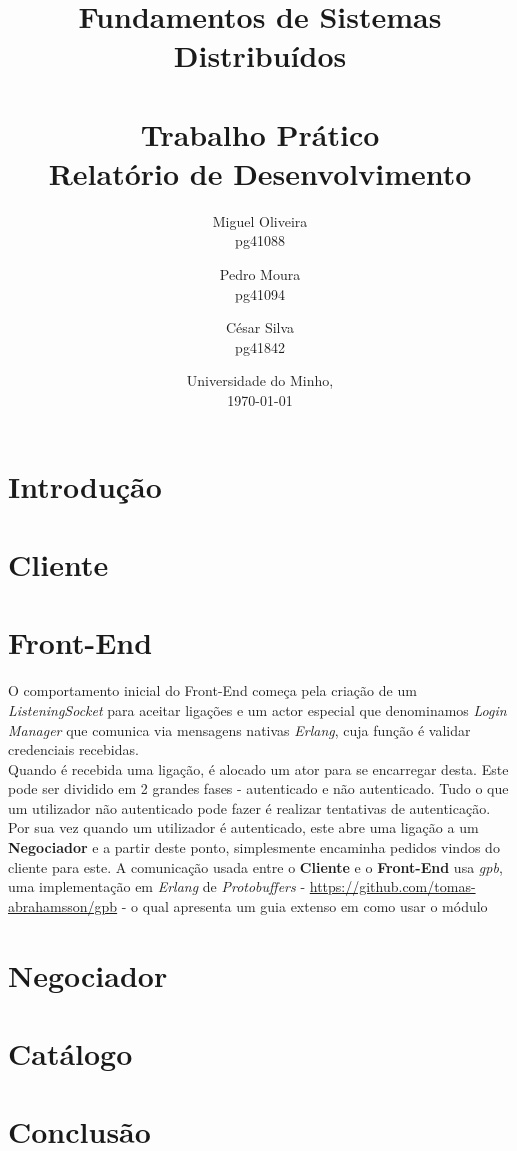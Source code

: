 \documentclass[12pt, a4paper]{report}
\begin{document}
\title{
    Fundamentos de Sistemas Distribuídos\\
    \textbf{\\Trabalho Prático}
    \large{\\Relatório de Desenvolvimento}
}

\author{
    Miguel Oliveira\\ pg41088
    \and Pedro Moura\\ pg41094
    \and César Silva\\ pg41842
}
\date{Universidade do Minho,\\\today}

\maketitle

\tableofcontents

\chapter{Introdução}

\chapter{Cliente}

\chapter{Front-End}

O comportamento inicial do Front-End começa pela criação de um
\textit{ListeningSocket} para aceitar ligações e um actor especial que 
denominamos \textit{Login Manager} que comunica via mensagens nativas
\textit{Erlang}, cuja função é validar credenciais recebidas. \\
Quando é recebida uma ligação, é alocado um ator para se encarregar desta.
Este pode ser dividido em 2 grandes fases - autenticado e não autenticado.
Tudo o que um utilizador não autenticado pode fazer é realizar tentativas de
autenticação. Por sua vez quando um utilizador é autenticado, este abre uma
ligação a um \textbf{Negociador} e a partir deste ponto, simplesmente encaminha
pedidos vindos do cliente para este. A comunicação usada entre
o \textbf{Cliente} e o \textbf{Front-End} usa \textit{gpb}, uma implementação em
\textit{Erlang} de \textit{Protobuffers}
- \url{https://github.com/tomas-abrahamsson/gpb} - o qual apresenta um guia
extenso em como usar o módulo

 
\chapter{Negociador}

\chapter{Catálogo}

\chapter{Conclusão}
\end{document}
